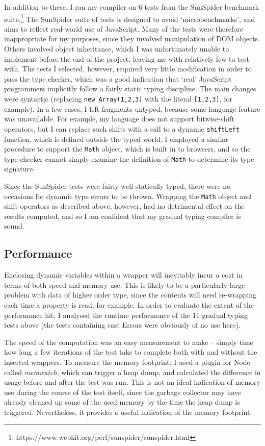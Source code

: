 \documentclass[12pt,a4paper,twoside,openright]{report}
\theoremstyle{definition}
\theoremstyle{dotless}
\newcommand*{\js}{\texttt}
\begin{document}
In addition to these, I ran my compiler on 6 tests from the SunSpider benchmark
suite.\footnote{https://www.webkit.org/perf/sunspider/sunspider.html} The
SunSpider suite of tests is designed to avoid `microbenchmarks', and aims to
reflect real-world use of JavaScript. Many of the tests were therefore
inappropriate for my purposes, since they involved manipulation of DOM objects.
Others involved object inheritance, which I was unfortunately unable to
implement before the end of the project, leaving me with relatively few to test
with. The tests I selected, however, required very little modification in order
to pass the type checker, which was a good indication that `real' JavaScript
programmers implicitly follow a fairly static typing discipline. The main
changes were syntactic (replacing \js{new Array(1,2,3)} with the literal
\js{[1,2,3]}, for example). In a few cases, I left fragments untyped, because
some language feature was unavailable. For example, my language does not
support bitwise-shift operators, but I can replace such shifts with a call to a
dynamic \js{shiftLeft} function, which is defined outside the typed world. I
employed a similar procedure to support the \js{Math} object, which is built in
to browsers, and so the type-checker cannot simply examine the definition of
\js{Math} to determine its type signature.

Since the SunSpider tests were fairly well statically typed, there were no
occasions for dynamic type errors to be thrown. Wrapping the \js{Math} object
and shift operators as described above, however, had no detrimental effect on
the results computed, and so I am confident that my gradual typing compiler is
sound.

\subsection*{Performance}

Enclosing dynamic variables within a wrapper will inevitably incur a cost in
terms of both speed and memory use. This is likely to be a particularly large
problem with data of higher order type, since the contents will need
re-wrapping each time a property is read, for example. In order to evaluate the
extent of the performance hit, I analysed the runtime performance of the 11
gradual typing tests above (the tests containing cast Errors were obviously
of no use here).

The speed of the computation was an easy measurement to make -- simply time how
long a few iterations of the test take to complete both with and without the
inserted wrappers. To measure the memory footprint, I used a plugin for Node
called \textit{memwatch}, which can trigger a heap dump, and calculated the
difference in usage before and after the test was run. This is not an ideal
indication of memory use during the course of the test itself, since the
garbage collector may have already cleaned up some of the used memory by the
time the heap dump is triggered. Nevertheless, it provides a useful indication
of the memory footprint.
\end{document}

